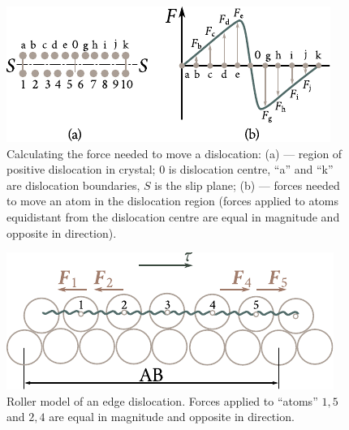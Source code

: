 \begin{figure}[t]
	\begin{center}
		\includegraphics[scale=1.2]{figures/ch_02/fig_2_16.pdf}
		\caption[]{Calculating the force needed to move a dislocation: (a) --- region of positive dislocation in crystal; $0$ is dislocation centre, ``a'' and ``k'' are dislocation boundaries, $S$ is the slip plane; (b) --- forces needed to move an atom in the dislocation region (forces applied to atoms equidistant from the dislocation centre are equal in magnitude and opposite in direction).}
		\label{fig:2_16}
	\end{center}
	\vspace{-0.7cm}
\end{figure}
\begin{figure}[t]
	\begin{center}
		\includegraphics[scale=1.0]{figures/ch_02/fig_2_17.pdf}
		\caption[]{Roller model of an edge dislocation. Forces applied to ``atoms'' $1, 5$ and $2, 4$ are equal in magnitude and opposite in direction.}
		\label{fig:2_17}
	\end{center}
	\vspace{-0.7cm}
\end{figure}

